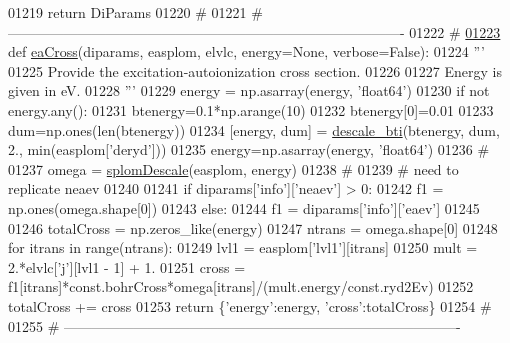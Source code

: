 \begin{DoxyCode}
{{{{{{{{{{{{01219     \textcolor{keywordflow}{return} DiParams
01220     \textcolor{comment}{#}
01221     \textcolor{comment}{# -------------------------------------------------------------------------------------}
01222     \textcolor{comment}{#}
\hypertarget{__chianti__tools_8py_source_l01223}{}\hyperlink{namespacepyneb_1_1utils_1_1__chianti__tools_a5c2be70e50273734d319a433bf39ce5b}{01223} \textcolor{keyword}{def }\hyperlink{namespacepyneb_1_1utils_1_1__chianti__tools_a5c2be70e50273734d319a433bf39ce5b}{eaCross}(diparams, easplom, elvlc, energy=None, verbose=False):
01224     \textcolor{stringliteral}{'''}
01225 \textcolor{stringliteral}{    Provide the excitation-autoionization cross section.}
01226 \textcolor{stringliteral}{}
01227 \textcolor{stringliteral}{    Energy is given in eV.}
01228 \textcolor{stringliteral}{    '''}
01229     energy = np.asarray(energy, \textcolor{stringliteral}{'float64'})
01230     \textcolor{keywordflow}{if} \textcolor{keywordflow}{not} energy.any():
01231         btenergy=0.1*np.arange(10)
01232         btenergy[0]=0.01
01233         dum=np.ones(len(btenergy))
01234         [energy, dum] = \hyperlink{namespacepyneb_1_1utils_1_1__chianti__tools_a47075ba90f01cbd7a3dbd08115544214}{descale\_bti}(btenergy, dum, 2., min(easplom[\textcolor{stringliteral}{'deryd'}]))
01235         energy=np.asarray(energy, \textcolor{stringliteral}{'float64'})
01236     \textcolor{comment}{#}
01237     omega = \hyperlink{namespacepyneb_1_1utils_1_1__chianti__tools_a391eb09a09769234e5759d5544d0bcaf}{splomDescale}(easplom, energy)
01238     \textcolor{comment}{#}
01239     \textcolor{comment}{#  need to replicate neaev}
01240 
01241     \textcolor{keywordflow}{if} diparams[\textcolor{stringliteral}{'info'}][\textcolor{stringliteral}{'neaev'}] > 0:
01242         f1 = np.ones(omega.shape[0])
01243     \textcolor{keywordflow}{else}:
01244         f1 = diparams[\textcolor{stringliteral}{'info'}][\textcolor{stringliteral}{'eaev'}]
01245 
01246     totalCross = np.zeros\_like(energy)
01247     ntrans = omega.shape[0]
01248     \textcolor{keywordflow}{for} itrans \textcolor{keywordflow}{in} range(ntrans):
01249         lvl1 = easplom[\textcolor{stringliteral}{'lvl1'}][itrans]
01250         mult = 2.*elvlc[\textcolor{stringliteral}{'j'}][lvl1 - 1] + 1.
01251         cross = f1[itrans]*const.bohrCross*omega[itrans]/(mult.energy/const.ryd2Ev)
01252         totalCross += cross
01253     \textcolor{keywordflow}{return} \{\textcolor{stringliteral}{'energy'}:energy, \textcolor{stringliteral}{'cross'}:totalCross\}
01254     \textcolor{comment}{#}
01255     \textcolor{comment}{# -------------------------------------------------------------------------------------}
}}}}}}}}}}}}
\end{DoxyCode}

